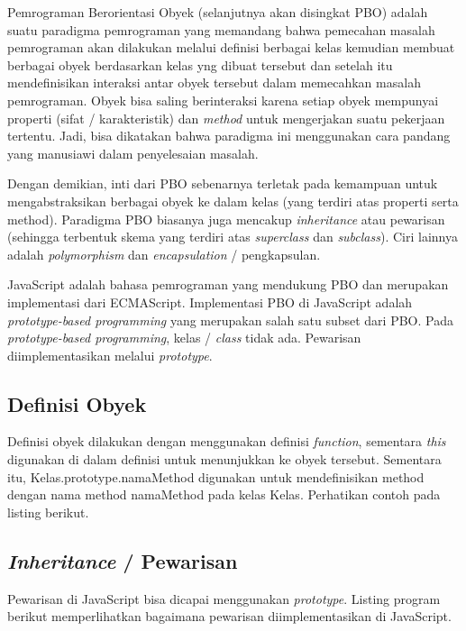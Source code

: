 Pemrograman Berorientasi Obyek (selanjutnya akan disingkat PBO) adalah suatu paradigma pemrograman yang memandang bahwa pemecahan masalah pemrograman akan dilakukan melalui definisi berbagai kelas kemudian membuat berbagai obyek berdasarkan kelas yng dibuat tersebut dan setelah itu mendefinisikan interaksi antar obyek tersebut dalam memecahkan masalah pemrograman. Obyek bisa saling berinteraksi karena setiap obyek mempunyai properti (sifat / karakteristik) dan \textit{method} untuk mengerjakan suatu pekerjaan tertentu. Jadi, bisa dikatakan bahwa paradigma ini menggunakan cara pandang yang manusiawi dalam penyelesaian masalah.

Dengan demikian, inti dari PBO sebenarnya terletak pada kemampuan untuk mengabstraksikan berbagai obyek ke dalam kelas (yang terdiri atas properti serta method). Paradigma PBO biasanya juga mencakup \textit{inheritance} atau pewarisan (sehingga terbentuk skema yang terdiri atas \textit{superclass} dan \textit{subclass}). Ciri lainnya adalah \textit{polymorphism} dan \textit{encapsulation} / pengkapsulan.

JavaScript adalah bahasa pemrograman yang mendukung PBO dan merupakan implementasi dari ECMAScript. Implementasi PBO di JavaScript adalah \textit{prototype-based programming} yang merupakan salah satu subset dari PBO. Pada \textit{prototype-based programming}, kelas / \textit{class} tidak ada. Pewarisan diimplementasikan melalui \textit{prototype}.

\subsection{Definisi Obyek}

Definisi obyek dilakukan dengan menggunakan definisi \textit{function}, sementara \textit{this} digunakan di dalam definisi untuk menunjukkan ke obyek tersebut. Sementara itu, Kelas.prototype.namaMethod digunakan untuk mendefinisikan method dengan nama method namaMethod pada kelas Kelas. Perhatikan contoh pada listing berikut.

\lstset{language=JavaScript,caption=Definisi obyek di JavaScript}


\subsection{\textit{Inheritance} / Pewarisan}

Pewarisan di JavaScript bisa dicapai menggunakan \textit{prototype}. Listing program berikut memperlihatkan bagaimana pewarisan diimplementasikan di JavaScript.

\lstset{language=JavaScript,caption=Pewarisan di PBO JavaScript}

